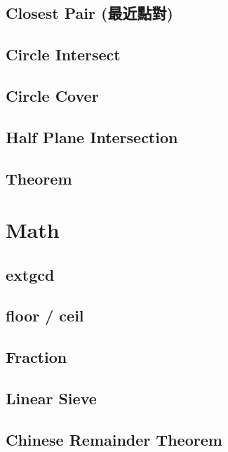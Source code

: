 \subsection{Closest Pair (最近點對)}

\subsection{Circle Intersect}

\subsection{Circle Cover}

% 
\subsection{Half Plane Intersection}

\subsection{Theorem}


\section{Math}
\subsection{extgcd}

\subsection{floor / ceil}

\subsection{Fraction}

\subsection{Linear Sieve}

\subsection{Chinese Remainder Theorem}

